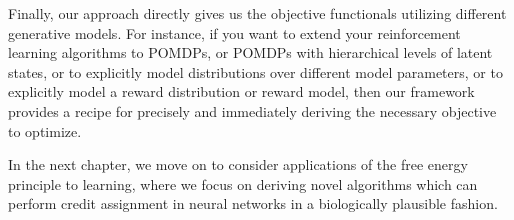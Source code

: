 Finally, our approach directly gives us the objective functionals  utilizing different generative models. For instance, if you want to extend your reinforcement learning algorithms to POMDPs, or POMDPs with hierarchical levels of latent states, or to explicitly model distributions over different model parameters, or to explicitly model a reward distribution or reward model, then our framework provides a recipe for precisely and immediately deriving the necessary objective to optimize. 

In the next chapter, we move on to consider applications of the free energy principle to learning, where we focus on deriving novel algorithms which can perform credit assignment in neural networks in a biologically plausible fashion.
